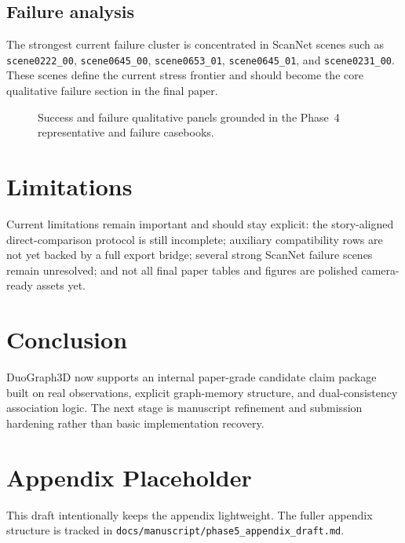 \documentclass[11pt]{article}
\begin{document}
\subsection{Failure analysis}
The strongest current failure cluster is concentrated in ScanNet scenes such as \texttt{scene0222\_00}, \texttt{scene0645\_00}, \texttt{scene0653\_01}, \texttt{scene0645\_01}, and \texttt{scene0231\_00}. These scenes define the current stress frontier and should become the core qualitative failure section in the final paper.

\begin{figure}[t]
\centering
\begin{minipage}{0.47\linewidth}
\small
{}
\end{minipage}
\hfill
\begin{minipage}{0.47\linewidth}
\small
{}
\end{minipage}
\caption{Success and failure qualitative panels grounded in the Phase~4 representative and failure casebooks.}
\end{figure}

\section{Limitations}
Current limitations remain important and should stay explicit: the story-aligned direct-comparison protocol is still incomplete; auxiliary compatibility rows are not yet backed by a full export bridge; several strong ScanNet failure scenes remain unresolved; and not all final paper tables and figures are polished camera-ready assets yet.

\section{Conclusion}
DuoGraph3D now supports an internal paper-grade candidate claim package built on real observations, explicit graph-memory structure, and dual-consistency association logic. The next stage is manuscript refinement and submission hardening rather than basic implementation recovery.

\appendix
\section{Appendix Placeholder}
This draft intentionally keeps the appendix lightweight. The fuller appendix structure is tracked in \texttt{docs/manuscript/phase5\_appendix\_draft.md}.
\end{document}
